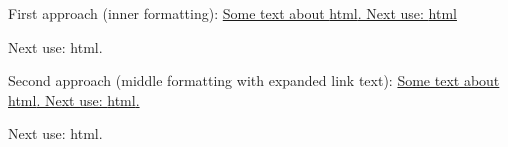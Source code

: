 \documentclass[12pt]{article}
\begin{document}
First approach (inner formatting):
{%
 \renewcommand{\glsxtrdefaultentrytextfmt}[1]{\ul{#1}}%
 \ul{Some text about \protect\gls{html}.
 Next use: \protect\gls{html}}
}


Next use: \gls{html}.


Second approach (middle formatting with expanded link text):
\glsresetall
{%
 \renewcommand{\glsxtrabbreviationfont}[1]{\xpul{#1}}%
 \renewcommand{\glsxtrregularfont}[1]{\xpul{#1}}%
 \ul{Some text about \protect\gls{html}. Next use: \gls{html}.}
} 

Next use: \gls{html}. 
\end{document}
